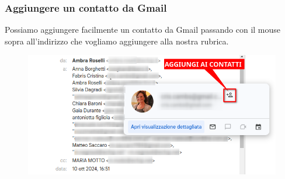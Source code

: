 \documentclass[]{beamer}
\begin{document}
\begin{frame}
\frametitle{Aggiungere un contatto da Gmail}
Possiamo aggiungere facilmente un contatto da Gmail passando con il mouse sopra all'indirizzo che vogliamo aggiungere alla nostra rubrica.

\begin{figure}
  \includegraphics[width=.8\columnwidth]{img/aggiungicontatto.png}
\end{figure}
\end{frame}
\end{document}
